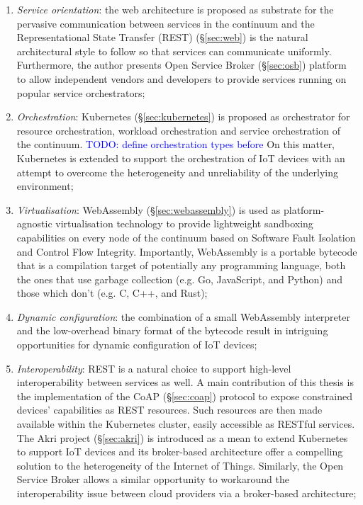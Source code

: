\begin{enumerate}
    \item \emph{Service orientation}: the web architecture is proposed as substrate for the pervasive communication between services in the continuum and the Representational State Transfer (REST) (§\ref{sec:web}) is the natural architectural style to follow so that services can communicate uniformly. Furthermore, the author presents Open Service Broker (§\ref{sec:osb}) platform to allow independent vendors and developers to provide services running on popular service orchestrators;
    \item \emph{Orchestration}: Kubernetes (§\ref{sec:kubernetes}) is proposed as orchestrator for resource orchestration, workload orchestration and service orchestration of the continuum. \textcolor{blue}{TODO: define orchestration types before} On this matter, Kubernetes is extended to support the orchestration of IoT devices with an attempt to overcome the heterogeneity and unreliability of the underlying environment;
    \item \emph{Virtualisation}: WebAssembly (§\ref{sec:webassembly}) is used as platform-agnostic virtualisation technology to provide lightweight sandboxing capabilities on every node of the continuum based on Software Fault Isolation and Control Flow Integrity. Importantly, WebAssembly is a portable bytecode that is a compilation target of potentially any programming language, both the ones that use garbage collection (e.g. Go, JavaScript, and Python) and those which don't (e.g. C, C++, and Rust);
    \item \emph{Dynamic configuration}: the combination of a small WebAssembly interpreter and the low-overhead binary format of the bytecode result in intriguing opportunities for dynamic configuration of IoT devices;
    \item \emph{Interoperability}: REST is a natural choice to support high-level interoperability between services as well. A main contribution of this thesis is the implementation of the CoAP (§\ref{sec:coap}) protocol to expose constrained devices' capabilities as REST resources. Such resources are then made available within the Kubernetes cluster, easily accessible as RESTful services. The Akri project (§\ref{sec:akri}) is introduced as a mean to extend Kubernetes to support IoT devices and its broker-based architecture offer a compelling solution to the heterogeneity of the Internet of Things. Similarly, the Open Service Broker allows a similar opportunity to workaround the interoperability issue between cloud providers via a broker-based architecture;

\end{enumerate}
